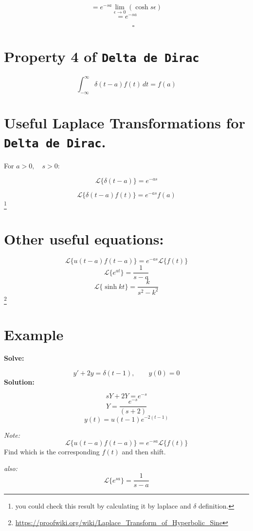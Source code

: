 \documentclass[
  letterpaper,
  DIV=11,
  numbers=noendperiod]{scrreprt}
\theoremstyle{plain}
\theoremstyle{remark}
\begin{document}
\[= e^{-sa}\lim_{\epsilon \rightarrow 0} (\cosh s\epsilon)\]
\[=e^{-sa}\]

\[\qquad\square\]

\section{\texorpdfstring{Property 4 of
\texttt{Delta\ de\ Dirac}}{Property 4 of Delta de Dirac}}\label{property-4-of-delta-de-dirac}

\[\boxed{\int_{-\infty}^\infty\delta(t-a)f(t)\,dt=f(a)}\]

\section{\texorpdfstring{Useful Laplace Transformations for
\texttt{Delta\ de\ Dirac}.}{Useful Laplace Transformations for Delta de Dirac.}}\label{useful-laplace-transformations-for-delta-de-dirac.}

For \(a>0,\quad s>0\):

\[\boxed{\mathscr{L}\{\delta(t-a)\}=e^{-as}}\]

\[\boxed{\mathscr{L}\{\delta(t-a)f(t)\}=e^{-as}f(a)}\]\footnote{you
  could check this result by calculating it by laplace and \(\delta\)
  definition.}

\section{Other useful equations:}\label{other-useful-equations}

\[\boxed{\mathscr{L}\{u(t-a)f(t-a)\}=e^{-as}\mathscr{L}\{f(t)\}}\]
\[\boxed{\mathscr{L}\{e^{at}\}=\frac{1}{s-a}}\]
\[\boxed{\mathscr{L}\{\sinh {kt}\}=\frac{k}{s^2-k^2}}\]\footnote{\url{https://proofwiki.org/wiki/Laplace_Transform_of_Hyperbolic_Sine}}

\section{Example}\label{example-43}

\textbf{Solve:}

\[y'+2y=\delta(t-1),\qquad y(0)=0\] \textbf{Solution:}

\[sY+2Y=e^{-s}\] \[Y=\frac{e^{-s}}{(s+2)}\]
\[\boxed{y(t) = u(t-1)e^{-2(t-1)}}\]

\emph{Note:} \[\mathscr{L}\{u(t-a)f(t-a)\}=e^{-sa}\mathscr{L}\{f(t)\}\]
Find which is the corresponding \(f(t)\) and then shift.

\emph{also:} \[ \mathscr{L}\{e^{sa}\}=\frac{1}{s-a}\]
\end{document}
